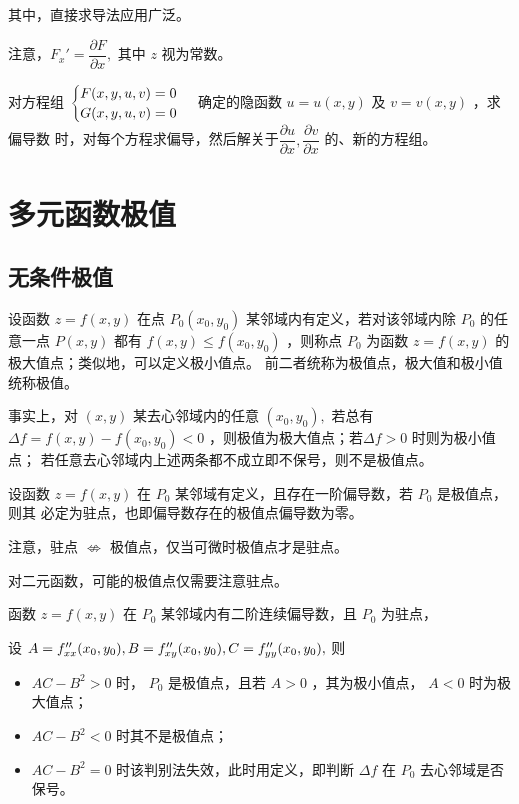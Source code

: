 其中，直接求导法应用广泛。

注意，$ F_x' = \dfrac{\partial F}{\partial x}, $ 其中 $ z $ 视为常数。

对方程组 $ \displaystyle \begin{cases}
    F(x,y,u,v) = 0 \\ G(x,y,u,v) = 0
\end{cases} $ 确定的隐函数 $ u = u(x,y) $ 及 $ v = v(x,y) $ ，求偏导数
时，对每个方程求偏导，然后解关于$ \dfrac{\partial u}{\partial x},\dfrac{\partial v}{\partial x} $ 的、新的方程组。


\section{多元函数极值}

\subsection{无条件极值}

\begin{Def}[无条件极值]
    
    设函数 $ z = f(x,y) $ 在点 $ P_0(x_0,y_0) $ 某邻域内有定义，若对该邻域内除 $ P_0 $ 的任意一点 $ P(x,y) $ 
    都有 $ f(x,y)\leq f(x_0,y_0) $ ，则称点 $ P_0 $ 为函数 $ z = f(x,y) $ 的极大值点；类似地，可以定义极小值点。
    前二者统称为极值点，极大值和极小值统称极值。
\end{Def}

事实上，对 $ (x,y) $ 某去心邻域内的任意 $ (x_0,y_0), $ 
若总有 $ \Delta f = f(x,y) - f(x_0,y_0) < 0 $ ，则极值为极大值点；若$ \Delta f > 0 $ 时则为极小值点；
若任意去心邻域内上述两条都不成立即不保号，则不是极值点。
    
\begin{Theo}[二元函数极值存在的必要条件]

    设函数 $ z = f(x,y) $ 在 $ P_0 $ 某邻域有定义，且存在一阶偏导数，若 $ P_0 $ 是极值点，则其
    必定为驻点，也即偏导数存在的极值点偏导数为零。
\end{Theo}

注意，驻点 $ \nLeftrightarrow $ 极值点，仅当可微时极值点才是驻点。

对二元函数，可能的极值点仅需要注意驻点。

\begin{Theo}[二元函数极值存在的充分条件]

    函数 $ z = f(x,y) $ 在 $ P_0 $ 某邻域内有二阶连续偏导数，且 $ P_0 $ 为驻点，

    设 $ A = f^{\prime\prime}_{xx}(x_0,y_0),B = f^{\prime\prime}_{xy}(x_0,y_0),C = f^{\prime\prime}_{yy}(x_0,y_0), $ 则
    \begin{itemize}
        \item $ AC - B^2 > 0 $ 时， $ P_0 $ 是极值点，且若 $ A>0 $ ，其为极小值点，
        $ A<0 $ 时为极大值点；
        \item $ AC-B^2<0 $ 时其不是极值点；
        \item $ AC-B^2 = 0 $ 时该判别法失效，此时用定义，即判断 $ \Delta f $ 在
        $ P_0 $ 去心邻域是否保号。
    \end{itemize}
\end{Theo}

